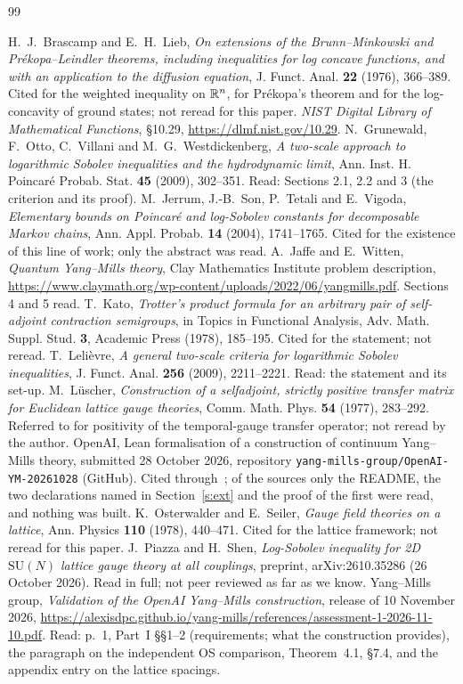 \begin{thebibliography}{99}\raggedright
{} H.~J.~Brascamp and E.~H.~Lieb, \emph{On extensions of the Brunn--Minkowski and
Pr\'ekopa--Leindler theorems, including inequalities for log concave functions, and with an application to
the diffusion equation}, J. Funct. Anal. \textbf{22} (1976), 366--389. Cited for the weighted inequality on
$\mathbb{R}^n$, for Pr\'ekopa's theorem and for the log-concavity of ground states; not reread for this paper.
 \emph{NIST Digital Library of Mathematical Functions}, \S10.29, \url{https://dlmf.nist.gov/10.29}.
 N.~Grunewald, F.~Otto, C.~Villani and M.~G.~Westdickenberg, \emph{A two-scale approach to
logarithmic Sobolev inequalities and the hydrodynamic limit}, Ann. Inst. H. Poincar\'e Probab. Stat.
\textbf{45} (2009), 302--351. Read: Sections 2.1, 2.2 and 3 (the criterion and its proof).
 M.~Jerrum, J.-B.~Son, P.~Tetali and E.~Vigoda, \emph{Elementary bounds on Poincar\'e and
log-Sobolev constants for decomposable Markov chains}, Ann. Appl. Probab. \textbf{14} (2004), 1741--1765.
Cited for the existence of this line of work; only the abstract was read.
 A.~Jaffe and E.~Witten, \emph{Quantum Yang--Mills theory}, Clay Mathematics Institute problem
description, \url{https://www.claymath.org/wp-content/uploads/2022/06/yangmills.pdf}. Sections 4 and 5 read.
 T.~Kato, \emph{Trotter's product formula for an arbitrary pair of self-adjoint contraction
semigroups}, in Topics in Functional Analysis, Adv. Math. Suppl. Stud. \textbf{3}, Academic Press (1978),
185--195. Cited for the statement; not reread.
 T.~Leli\`evre, \emph{A general two-scale criteria for logarithmic Sobolev inequalities},
J. Funct. Anal. \textbf{256} (2009), 2211--2221. Read: the statement and its set-up.
 M.~L\"uscher, \emph{Construction of a selfadjoint, strictly positive transfer matrix for
Euclidean lattice gauge theories}, Comm. Math. Phys. \textbf{54} (1977), 283--292. Referred to for positivity
of the temporal-gauge transfer operator; not reread by the author.
 OpenAI, Lean formalisation of a construction of continuum Yang--Mills theory, submitted
28 October 2026, repository \texttt{yang-mills-group/OpenAI-YM-20261028} (GitHub). Cited through~\cite{YMG}; of the
sources only the README, the two declarations named in Section~\ref{s:ext} and the proof of the first were read, and nothing was built.
 K.~Osterwalder and E.~Seiler, \emph{Gauge field theories on a lattice}, Ann. Physics
\textbf{110} (1978), 440--471. Cited for the lattice framework; not reread for this paper.
 J.~Piazza and H.~Shen, \emph{Log-Sobolev inequality for 2D $\mathrm{SU}(N)$ lattice gauge theory at
all couplings}, preprint, arXiv:2610.35286 (26 October 2026). Read in full; not peer reviewed as far as we know.
 Yang--Mills group, \emph{Validation of the OpenAI Yang--Mills construction}, release of
10 November 2026, \url{https://alexisdpc.github.io/yang-mills/references/assessment-1-2026-11-10.pdf}. Read:
p.~1, Part~I \S\S1--2 (requirements; what the construction provides), the paragraph on the independent
OS comparison, Theorem~4.1, \S7.4, and the appendix entry on the lattice spacings.


\end{thebibliography}
